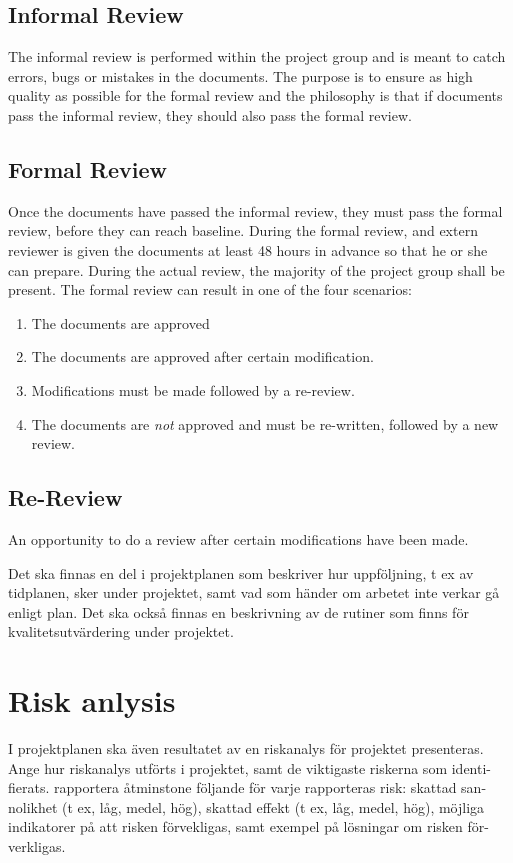 \documentclass{article}
\begin{document}
    \subsection{Informal Review}
        The informal review is performed within the project group and is meant to catch
        errors, bugs or mistakes in the documents. The purpose is to ensure as high quality
        as possible for the formal review and the philosophy is that if documents pass
        the informal review, they should also pass the formal review.
        
    \subsection{Formal Review}
        Once the documents have passed the informal review, they must pass the formal review,
        before they can reach baseline. During the formal review, and extern reviewer is
        given the documents at least 48 hours in advance so that he or she can prepare.
        During the actual review, the majority of the project group shall be present.
        The formal review can result in one of the four scenarios:
        \begin{enumerate}
            \item The documents are approved
            \item The documents are approved after certain modification.
            \item Modifications must be made followed by a re-review.
            \item The documents are \emph{not} approved and must be re-written,
                    followed by a new review.
        \end{enumerate}
    
    \subsection{Re-Review}
        An opportunity to do a review after certain modifications have been made.
        

Det ska finnas en del i projektplanen som beskriver hur uppföljning, t ex av
tidplanen, sker under projektet, samt vad som händer om arbetet inte verkar
gå enligt plan. Det ska också finnas en beskrivning av de rutiner som finns för
kvalitetsutvärdering under projektet.

    

\section{Risk anlysis}

I projektplanen ska även resultatet av en riskanalys för projektet presenteras.
Ange hur riskanalys utförts i projektet, samt de viktigaste riskerna som identi-
fierats. rapportera åtminstone följande för varje rapporteras risk: skattad san-
nolikhet (t ex, låg, medel, hög), skattad effekt (t ex, låg, medel, hög), möjliga
indikatorer på att risken förvekligas, samt exempel på lösningar om risken för-
verkligas.
\end{document}

